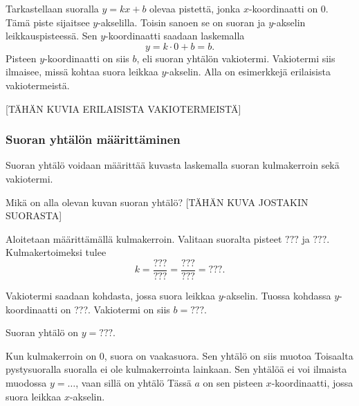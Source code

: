 Tarkastellaan suoralla $y=kx+b$ olevaa pistettä, jonka $x$-koordinaatti on 0.
Tämä piste sijaitsee $y$-akselilla. Toisin sanoen se on suoran ja $y$-akselin leikkauspisteessä.
Sen $y$-koordinaatti saadaan laskemalla
\[
y=k\cdot 0+b=b.
\]
Pisteen $y$-koordinaatti on siis $b$, eli suoran yhtälön vakiotermi. Vakiotermi siis ilmaisee, missä kohtaa suora leikkaa $y$-akselin.
Alla on esimerkkejä erilaisista vakiotermeistä.

[TÄHÄN KUVIA ERILAISISTA VAKIOTERMEISTÄ]

\subsubsection*{Suoran yhtälön määrittäminen}

Suoran yhtälö voidaan määrittää kuvasta laskemalla suoran kulmakerroin sekä vakiotermi.

\begin{esimerkki} Mikä on alla olevan kuvan suoran yhtälö?
[TÄHÄN KUVA JOSTAKIN SUORASTA]
\begin{esimratk}
Aloitetaan määrittämällä kulmakerroin. Valitaan suoralta pisteet $???$ ja $???$. Kulmakertoimeksi tulee
\[
k=\frac{???}{???}=\frac{???}{???}=???.
\]
\end{esimratk}
Vakiotermi saadaan kohdasta, jossa suora leikkaa $y$-akselin. Tuossa kohdassa $y$-koordinaatti on ???. Vakiotermi on siis $b=???$.
\begin{esimvast}
Suoran yhtälö on $y=???$.
\end{esimvast}
\end{esimerkki}

Kun kulmakerroin on 0, suora on vaakasuora. Sen yhtälö on siis muotoa
Toisaalta pystysuoralla suoralla ei ole kulmakerrointa lainkaan. Sen yhtälöä ei voi ilmaista muodossa $y=\dots$, vaan sillä on yhtälö
Tässä $a$ on sen pisteen $x$-koordinaatti, jossa suora leikkaa $x$-akselin.

